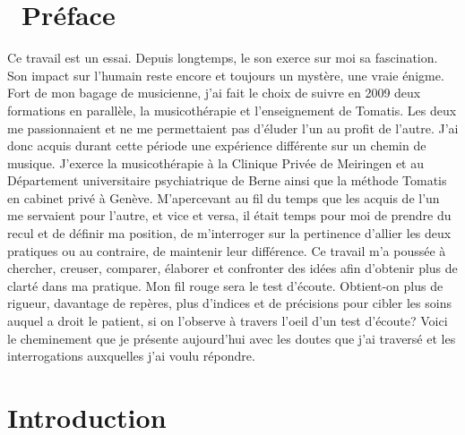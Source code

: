 
\chapter*{\ Préface}
Ce travail est un essai. Depuis longtemps, le son exerce sur moi sa fascination.
 Son impact sur l'humain reste encore et toujours un mystère, une vraie énigme. 
 Fort de mon bagage de musicienne, j'ai fait  le choix de suivre en 2009 deux formations en parallèle,  
 la musicothérapie et l'enseignement de  Tomatis. Les deux me passionnaient et ne me permettaient pas 
 d'éluder l'un au profit de l'autre. J'ai donc acquis durant cette période une expérience différente sur un 
 chemin de musique. J'exerce   la musicothérapie à la Clinique Privée de Meiringen  et au Département 
 universitaire psychiatrique de Berne ainsi que  la méthode 
 Tomatis en cabinet privé à Genève. M'apercevant au fil du temps que les 
 acquis de l'un me servaient  pour l'autre, et vice et versa, il  était temps pour moi de prendre du recul et 
 de définir ma position, de m'interroger sur la pertinence d'allier  les deux pratiques 
 ou au contraire, de maintenir  leur différence.  Ce travail m'a poussée à chercher, creuser, comparer, 
 élaborer et 
 confronter des idées afin d'obtenir plus de clarté dans ma pratique.
 Mon fil rouge sera le test d'écoute.
 Obtient-on  plus de rigueur, davantage de repères, plus d'indices et de précisions pour cibler les 
 soins auquel a droit le patient, si on l'observe à travers l'oeil d'un test d'écoute?
  Voici le cheminement que je présente aujourd'hui avec les doutes que j'ai traversé et les interrogations 
  auxquelles j'ai 
  voulu répondre. 


\chapter{Introduction}



